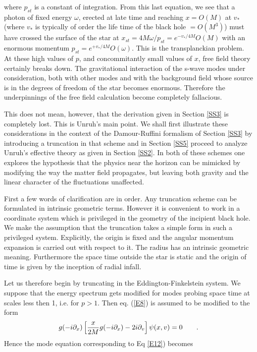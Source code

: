 \documentclass[12pt]{article}
\begin{document}
\noindent where $p_{st}$ is a  constant of integration. From this last equation,
we see that a photon of fixed energy $\omega$, erected at late time and
reaching $ x = O (M)$ at $ v_*$ (where $v_*$ is typically of order the life
time of the black hole $=O(M^3)$) must  have crossed the surface of
the star  at $ x_{st}  = 4 M \omega /
p_{st} =e^{-v_*/4M} O (M) $ with an enormous momentum $ p_{st} = 
e^{+ v_*/ 4M} O(\omega)$. This is the transplanckian problem. At these high
values of $p$, and concommitantly small values of $x$, free field theory
certainly breaks down. The gravitational interaction of the s-wave modes under
consideration, both with other modes and with the background field whose source
is in the degrees of freedom of the star becomes enormous. Therefore the
underpinnings of the free field calculation become completely fallacious.

This does not mean, however, that the derivation given in Section \ref{SS3} is
completely lost. This is Unruh's main point. We shall first illustrate these
considerations in the context of the Damour-Ruffini formalism of Section \ref{SS3} by
introducing a truncation in that scheme and in Section \ref{SS5} proceed to
analyze Unruh's effective theory as given in Section \ref{SS2}. In both of
these schemes one explores the hypothesis that the physics near the horizon can
be mimicked by modifying the way the matter field propagates, but leaving both
gravity and the linear character of the fluctuations unaffected.

First a few words of clarification are in order. Any truncation scheme can be
formulated in intrinsic geometric terms. However it is convenient to work in a
coordinate system which is privileged in the geometry of the incipient black
hole. We make the assumption that the truncation takes a simple form in such a
privileged system. Explicitly, the origin is fixed and the angular momentum
expansion is carried out with respect to it. The radius has an intrinsic
geometric meaning. Furthermore the 
space time outside the star is static and the origin of
time is given by the inception of radial infall. 



Let us therefore begin by truncating in the Eddington-Finkelstein system. We suppose that the
energy spectrum gets modified for modes probing space time at scales less then
1, i.e. for $ p > 1$.  Then  eq. (\ref{E8}) 
is assumed to be modified to the form
\begin{equation}
g(-i\partial_x) \left[
{x \over 2M} g(-i\partial_x) - 2 i \partial_v \right] \psi(x,v) =0\qquad .
\label{E21a}
\end{equation}
Hence the mode equation corresponding to Eq \ref{E12}) becomes
\end{document}
